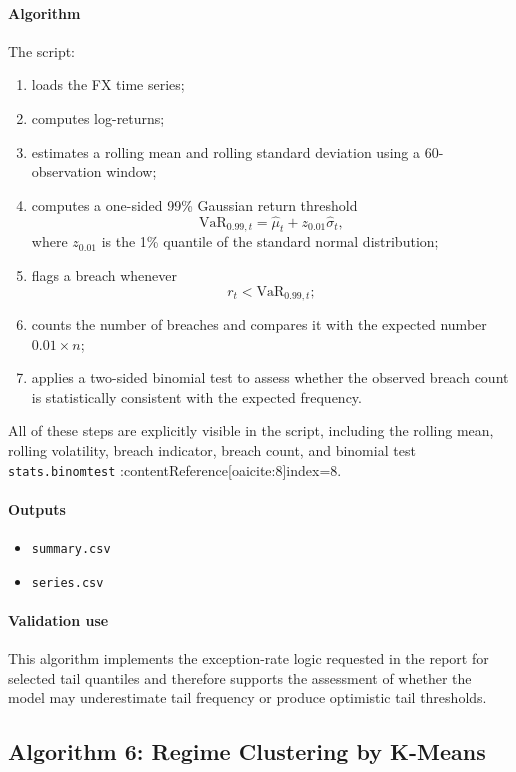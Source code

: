 	\paragraph{Algorithm}
	The script:
	\begin{enumerate}
		\item loads the FX time series;
		\item computes log-returns;
		\item estimates a rolling mean and rolling standard deviation using a 60-observation window;
		\item computes a one-sided 99\% Gaussian return threshold
		\[
		\text{VaR}_{0.99,t} = \hat{\mu}_t + z_{0.01}\hat{\sigma}_t,
		\]
		where \(z_{0.01}\) is the 1\% quantile of the standard normal distribution;
		\item flags a breach whenever
		\[
		r_t < \text{VaR}_{0.99,t};
		\]
		\item counts the number of breaches and compares it with the expected number \(0.01 \times n\);
		\item applies a two-sided binomial test to assess whether the observed breach count is statistically consistent with the expected frequency.
	\end{enumerate}
	
	All of these steps are explicitly visible in the script, including the rolling mean, rolling volatility, breach indicator, breach count, and binomial test \texttt{stats.binomtest} :contentReference[oaicite:8]{index=8}.
	
	\paragraph{Outputs}
	\begin{itemize}
		\item \texttt{summary.csv}
		\item \texttt{series.csv}
	\end{itemize}
	
	\paragraph{Validation use}
	This algorithm implements the exception-rate logic requested in the report for selected tail quantiles and therefore supports the assessment of whether the model may underestimate tail frequency or produce optimistic tail thresholds.
	
	\subsection{Algorithm 6: Regime Clustering by K-Means}
	
